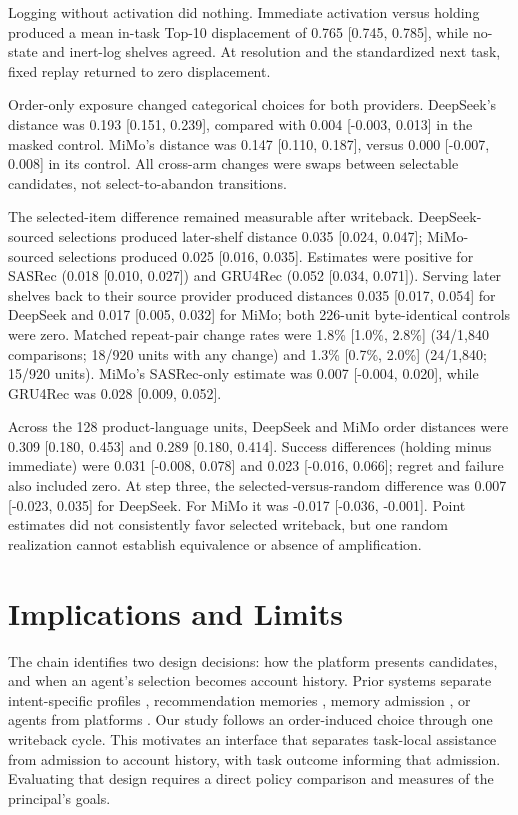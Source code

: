 \documentclass[sigconf]{acmart}
\begin{document}
Logging without activation did nothing. Immediate activation versus holding produced a mean
in-task Top-10 displacement of 0.765 [0.745, 0.785], while no-state and
inert-log shelves agreed. At resolution and the standardized next task, fixed
replay returned to zero displacement.

Order-only exposure changed categorical choices for both providers.
DeepSeek's distance was 0.193 [0.151, 0.239], compared with 0.004 [-0.003,
0.013] in the masked control. MiMo's distance was 0.147 [0.110, 0.187], versus
0.000 [-0.007, 0.008] in its control. All cross-arm changes were swaps between
selectable candidates, not select-to-abandon transitions.

The selected-item difference remained measurable after writeback.
DeepSeek-sourced selections produced later-shelf distance 0.035 [0.024,
0.047]; MiMo-sourced selections produced 0.025 [0.016, 0.035]. Estimates were
positive for SASRec (0.018 [0.010, 0.027]) and GRU4Rec (0.052 [0.034, 0.071]).
Serving later shelves back to their source provider produced distances
0.035 [0.017, 0.054] for DeepSeek and 0.017 [0.005, 0.032] for MiMo; both
226-unit byte-identical controls were zero. Matched repeat-pair change rates were 1.8\%
[1.0\%, 2.8\%] (34/1,840 comparisons; 18/920 units with any change) and 1.3\%
[0.7\%, 2.0\%] (24/1,840; 15/920 units). MiMo's SASRec-only
estimate was 0.007 [-0.004, 0.020], while GRU4Rec was 0.028 [0.009, 0.052].

Across the 128 product-language units, DeepSeek and MiMo order distances were
0.309 [0.180, 0.453] and 0.289 [0.180, 0.414]. Success differences (holding minus immediate)
were 0.031 [-0.008, 0.078] and 0.023 [-0.016, 0.066]; regret and failure also
included zero. At step three, the selected-versus-random difference was 0.007
[-0.023, 0.035] for DeepSeek. For MiMo it was -0.017 [-0.036, -0.001]. Point
estimates did not consistently favor selected writeback, but one random
realization cannot establish equivalence or absence of amplification.

\section{Implications and Limits}

The chain identifies two design decisions: how the platform presents candidates,
and when an agent's selection becomes account history. Prior systems separate intent-specific
profiles \cite{tsukuda2025intent}, recommendation memories
\cite{zhan2026calmrec}, memory admission \cite{xiong2026memory}, or agents from
platforms \cite{xu2025iagent}. Our study follows an order-induced choice through
one writeback cycle. This motivates an interface that separates task-local
assistance from admission to account history, with task outcome informing that
admission. Evaluating that design requires a direct policy comparison and
measures of the principal's goals.
\end{document}

